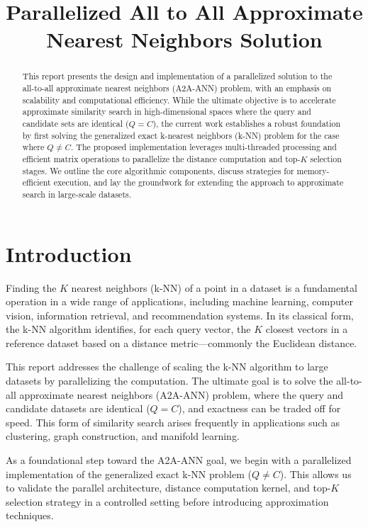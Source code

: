 \documentclass[conference]{IEEEtran}
\title{Parallelized All to All Approximate Nearest Neighbors Solution}
\author{\IEEEauthorblockN{Rousomanis Georgios (10703)}
\IEEEauthorblockA{Department of Electrical and Computer Engineering\\
Aristotle University of Thessaloniki\\
Email: rousoman@ece.auth.gr}
}
\begin{document}
\maketitle

\begin{abstract}
This report presents the design and implementation of a parallelized solution to the all-to-all 
approximate nearest neighbors (A2A-ANN) problem, with an emphasis on scalability and computational 
efficiency. While the ultimate objective is to accelerate approximate similarity search in 
high-dimensional spaces where the query and candidate sets are identical ($Q = C$), the current 
work establishes a robust foundation by first solving the generalized exact k-nearest neighbors 
(k-NN) problem for the case where $Q \neq C$. The proposed implementation leverages multi-threaded 
processing and efficient matrix operations to parallelize the distance computation and top-$K$ 
selection stages. We outline the core algorithmic components, discuss strategies for memory-efficient 
execution, and lay the groundwork for extending the approach to approximate search in large-scale datasets.

\end{abstract}

\section{Introduction}
Finding the $K$ nearest neighbors (k-NN) of a point in a dataset is a fundamental operation in a wide 
range of applications, including machine learning, computer vision, information retrieval, and recommendation
systems. In its classical form, the k-NN algorithm identifies, for each query vector, the $K$ closest vectors 
in a reference dataset based on a distance metric—commonly the Euclidean distance.

This report addresses the challenge of scaling the k-NN algorithm to large datasets by parallelizing the 
computation. The ultimate goal is to solve the all-to-all approximate nearest neighbors (A2A-ANN) problem, 
where the query and candidate datasets are identical ($Q = C$), and exactness can be traded off for speed. 
This form of similarity search arises frequently in applications such as clustering, graph construction, 
and manifold learning.

As a foundational step toward the A2A-ANN goal, we begin with a parallelized implementation of the 
generalized exact k-NN problem ($Q \neq C$). This allows us to validate the parallel architecture, distance
computation kernel, and top-$K$ selection strategy in a controlled setting before introducing approximation 
techniques.
\end{document}

